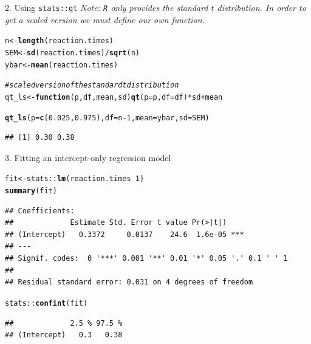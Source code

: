 \documentclass[10pt,handout]{beamer}\usepackage[]{graphicx}\usepackage[]{color}
\makeatletter
\newcommand{\hlnum}[1]{\textcolor[rgb]{0.686,0.059,0.569}{#1}}%
\newcommand{\hlcom}[1]{\textcolor[rgb]{0.678,0.584,0.686}{\textit{#1}}}%
\newcommand{\hlopt}[1]{\textcolor[rgb]{0,0,0}{#1}}%
\newcommand{\hlstd}[1]{\textcolor[rgb]{0.345,0.345,0.345}{#1}}%
\newcommand{\hlkwa}[1]{\textcolor[rgb]{0.161,0.373,0.58}{\textbf{#1}}}%
\newcommand{\hlkwb}[1]{\textcolor[rgb]{0.69,0.353,0.396}{#1}}%
\newcommand{\hlkwc}[1]{\textcolor[rgb]{0.333,0.667,0.333}{#1}}%
\newcommand{\hlkwd}[1]{\textcolor[rgb]{0.737,0.353,0.396}{\textbf{#1}}}%
\newenvironment{kframe}{%
 \def\at@end@of@kframe{}%
 \ifinner\ifhmode%
  \def\at@end@of@kframe{\end{minipage}}%
  \begin{minipage}{\columnwidth}%
 \fi\fi%
 \def\FrameCommand##1{\hskip\@totalleftmargin \hskip-\fboxsep
 \colorbox{shadecolor}{##1}\hskip-\fboxsep
     \hskip-\linewidth \hskip-\@totalleftmargin \hskip\columnwidth}%
 \MakeFramed {\advance\hsize-\width
   \@totalleftmargin\z@ \linewidth\hsize
   \@setminipage}}%
 {\par\unskip\endMakeFramed%
 \at@end@of@kframe}
\newenvironment{knitrout}{}{} %
\makeatother
\begin{document}
\begin{frame}[fragile]{2. Using \texttt{stats::qt}}
	\textit{Note: \texttt{R} only provides the standard $t$ distribution. In order to get a scaled version we must define our own function.}
	
	\vspace*{0.2in}
	
\begin{knitrout}\tiny
{}\color{fgcolor}\begin{kframe}
\begin{alltt}
\hlstd{n} \hlkwb{<-} \hlkwd{length}\hlstd{(reaction.times)}
\hlstd{SEM} \hlkwb{<-} \hlkwd{sd}\hlstd{(reaction.times)}\hlopt{/}\hlkwd{sqrt}\hlstd{(n)}
\hlstd{ybar} \hlkwb{<-} \hlkwd{mean}\hlstd{(reaction.times)}

\hlcom{# scaled version of the standard t distribution}
\hlstd{qt_ls} \hlkwb{<-} \hlkwa{function}\hlstd{(}\hlkwc{p}\hlstd{,} \hlkwc{df}\hlstd{,} \hlkwc{mean}\hlstd{,} \hlkwc{sd}\hlstd{)} \hlkwd{qt}\hlstd{(}\hlkwc{p} \hlstd{= p,} \hlkwc{df} \hlstd{= df)} \hlopt{*} \hlstd{sd} \hlopt{+} \hlstd{mean}

\hlkwd{qt_ls}\hlstd{(}\hlkwc{p} \hlstd{=} \hlkwd{c}\hlstd{(}\hlnum{0.025}\hlstd{,} \hlnum{0.975}\hlstd{),} \hlkwc{df} \hlstd{= n} \hlopt{-} \hlnum{1}\hlstd{,} \hlkwc{mean} \hlstd{= ybar,} \hlkwc{sd} \hlstd{= SEM)}
\end{alltt}
\begin{verbatim}
## [1] 0.30 0.38
\end{verbatim}
\end{kframe}
\end{knitrout}
\end{frame}


\begin{frame}[fragile]{3. Fitting an intercept-only regression model}
\begin{knitrout}\tiny
{}\color{fgcolor}\begin{kframe}
\begin{alltt}
\hlstd{fit} \hlkwb{<-} \hlstd{stats}\hlopt{::}\hlkwd{lm}\hlstd{(reaction.times} \hlopt{~} \hlnum{1}\hlstd{)}
\hlkwd{summary}\hlstd{(fit)}
\end{alltt}
\begin{verbatim}
## Coefficients:
##             Estimate Std. Error t value Pr(>|t|)    
## (Intercept)   0.3372     0.0137    24.6  1.6e-05 ***
## ---
## Signif. codes:  0 '***' 0.001 '**' 0.01 '*' 0.05 '.' 0.1 ' ' 1
## 
## Residual standard error: 0.031 on 4 degrees of freedom
\end{verbatim}
\begin{alltt}
\hlstd{stats}\hlopt{::}\hlkwd{confint}\hlstd{(fit)}
\end{alltt}
\begin{verbatim}
##             2.5 % 97.5 %
## (Intercept)   0.3   0.38
\end{verbatim}
\end{kframe}
\end{knitrout}
\end{frame}
\end{document}
